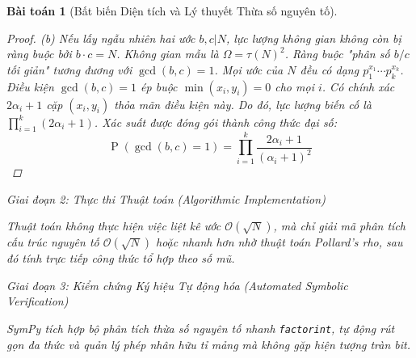 \documentclass{article}
\newtheorem{baitoan}{Bài toán}
\begin{document}
\begin{baitoan}[Bất biến Diện tích và Lý thuyết Thừa số nguyên tố]
\begin{proof}
 (b) Nếu lấy ngẫu nhiên hai ước $b, c | N$, lực lượng không gian không còn bị ràng buộc bởi $b \cdot c = N$. Không gian mẫu là $\Omega = \tau(N)^2$. Ràng buộc "phân số $b/c$ tối giản" tương đương với $\gcd(b,c) = 1$. Mọi ước của $N$ đều có dạng $p_1^{x_1}\cdots p_k^{x_k}$. Điều kiện $\gcd(b,c) = 1$ ép buộc $\min(x_i, y_i) = 0$ cho mọi $i$. Có chính xác $2\alpha_i + 1$ cặp $(x_i, y_i)$ thỏa mãn điều kiện này. Do đó, lực lượng biến cố là $\prod_{i=1}^k (2\alpha_i + 1)$. Xác suất được đóng gói thành công thức đại số:
 \begin{equation}
 \operatorname{P}(\gcd(b,c)=1) = \prod_{i=1}^k \frac{2\alpha_i + 1}{(\alpha_i + 1)^2}
 \end{equation}
 \end{proof}

\vspace{0.5em}\noindent\emph{Giai đoạn 2: Thực thi Thuật toán (Algorithmic Implementation)}
 
 Thuật toán không thực hiện việc liệt kê ước $\mathcal{O}(\sqrt{N})$, mà chỉ giải mã phân tích cấu trúc nguyên tố $\mathcal{O}(\sqrt{N})$ hoặc nhanh hơn nhờ thuật toán Pollard's rho, sau đó tính trực tiếp công thức tổ hợp theo số mũ.



\vspace{0.5em}\noindent\emph{Giai đoạn 3: Kiểm chứng Ký hiệu Tự động hóa (Automated Symbolic Verification)}
 
 \textsf{SymPy} tích hợp bộ phân tích thừa số nguyên tố nhanh \texttt{factorint}, tự động rút gọn đa thức và quản lý phép nhân hữu tỉ mảng mà không gặp hiện tượng tràn bit.




\end{baitoan}
\end{document}
